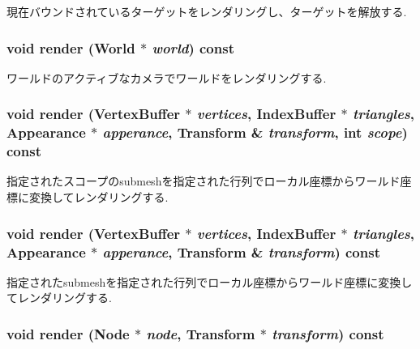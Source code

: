 現在バウンドされているターゲットをレンダリングし、ターゲットを解放する. \hypertarget{classm3g_1_1Graphics3D_8ef004c92d601203b8c697d441e7713f}{
\subsubsection[{render}]{\setlength{\rightskip}{0pt plus 5cm}void render ({\bf World} $\ast$ {\em world}) const}}
\label{classm3g_1_1Graphics3D_8ef004c92d601203b8c697d441e7713f}


ワールドのアクティブなカメラでワールドをレンダリングする. \hypertarget{classm3g_1_1Graphics3D_9179d0d886a57cd3234b34f1b59dfc3c}{
\subsubsection[{render}]{\setlength{\rightskip}{0pt plus 5cm}void render ({\bf VertexBuffer} $\ast$ {\em vertices}, \/  {\bf IndexBuffer} $\ast$ {\em triangles}, \/  {\bf Appearance} $\ast$ {\em apperance}, \/  {\bf Transform} \& {\em transform}, \/  int {\em scope}) const}}
\label{classm3g_1_1Graphics3D_9179d0d886a57cd3234b34f1b59dfc3c}


指定されたスコープのsubmeshを指定された行列でローカル座標からワールド座標に変換してレンダリングする. \hypertarget{classm3g_1_1Graphics3D_dc32291b31d6d3a32037eb9f727f73c0}{
\subsubsection[{render}]{\setlength{\rightskip}{0pt plus 5cm}void render ({\bf VertexBuffer} $\ast$ {\em vertices}, \/  {\bf IndexBuffer} $\ast$ {\em triangles}, \/  {\bf Appearance} $\ast$ {\em apperance}, \/  {\bf Transform} \& {\em transform}) const}}
\label{classm3g_1_1Graphics3D_dc32291b31d6d3a32037eb9f727f73c0}


指定されたsubmeshを指定された行列でローカル座標からワールド座標に変換してレンダリングする. \hypertarget{classm3g_1_1Graphics3D_9c9ca78b3ce4cc358783a1a2701b9d85}{
\subsubsection[{render}]{\setlength{\rightskip}{0pt plus 5cm}void render ({\bf Node} $\ast$ {\em node}, \/  {\bf Transform} $\ast$ {\em transform}) const}}
\label{classm3g_1_1Graphics3D_9c9ca78b3ce4cc358783a1a2701b9d85}


